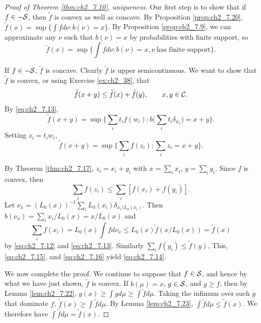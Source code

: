 \begin{proof}[Proof of Theorem \ref{thm:ch2_7.10}, uniqueness]
Our first step is to show that if $f \in -\mathcal{S}$, then $\widetilde{f}$ is convex as well as concave. By Proposition \ref{prop:ch2_7.20}, $\widetilde{f}(x) = \sup\{\int fd\nu : b(\nu) = x\}$. By Proposition \ref{prop:ch2_7.9}, we can approximate any $\nu$ such that $b(\nu) = x$ by probabilities with finite support, so
\begin{equation}\label{eq:ch2_7.13}
\widetilde{f}(x) = \sup\Big\{\int fd\nu : b(\nu) = x, \nu~\text{has finite support}\Big\}.
\end{equation}

If $f \in -\mathcal{S}$, $\widetilde{f}$ is concave. Clearly $\widetilde{f}$ is upper semicontinuous. We want to show that $\widetilde{f}$ is convex, or using Exercise \ref{ex:ch2_38}, that
\begin{equation}\label{eq:ch2_7.14}
    \widetilde{f}(x + y) \leq \widetilde{f}(x) + \widetilde{f}(y), \qquad x,y \in \mathcal{C}.
\end{equation}
By \eqref{eq:ch2_7.13},
\[
    \widetilde{f}(x + y) = \sup\Big\{\sum_i t_i f(w_i) : b\Big(\sum_i t_i\delta_{w_i}\Big) = x + y\Big\}.
\]
Setting $z_i=t_iw_i$,
\begin{equation}\label{eq:ch2_7.15}
    \widetilde{f}(x + y) = \sup\Big\{\sum_i f(z_i) : \sum_i z_i = x + y\Big\}.
\end{equation}

By Theorem \ref{thm:ch2_7.17}, $z_i = x_i + y_i$ with $x = \sum_i x_i$, $y = \sum_i y_i$. Since $f$ is convex, then
\begin{equation}\label{eq:ch2_7.16}
    \sum_i f(z_i) \leq \sum_i[f(x_i) + f(y_i)].
\end{equation}
Let $\nu_x = (L_0(x))^{-1}\sum_i L_0(x_i)\delta_{x_i/L_0(x_i)}$. Then $b(\nu_x) = \sum_i x_i/L_0(x) = x/L_0(x)$ and
\[
    \sum_i f(x_i) = L_0(x)\int fd\nu_x \leq L_0(x)\widetilde{f}(x/L_0(x)) = \widetilde{f}(x)
\]
by \eqref{eq:ch2_7.12} and \eqref{eq:ch2_7.13}. Similarly $\sum_i f(y_i) \leq \widetilde{f}(y)$, This, \eqref{eq:ch2_7.15}, and \eqref{eq:ch2_7.16} yield \eqref{eq:ch2_7.14}.


We now complete the proof. We continue to suppose that $f \in \mathcal{S}$, and hence by what we have just shown, $\widetilde{f}$ is convex. If $b(\mu) = x$, $g \in \mathcal{S}$, and $g \geq f$, then by Lemma \ref{lem:ch2_7.22}, $g(x) \geq \int gd\mu \geq \int \widetilde{f}d\mu$. Taking the infimum over such $g$ that dominate $f$, $\widetilde{f}(x) \geq \int \widetilde{f}d\mu$. By Lemma \ref{lem:ch2_7.23}, $\int \widetilde{f}d\mu \leq \widetilde{f}(x)$. We therefore have $\int \widetilde{f}d\mu = \widetilde{f}(x)$.


\end{proof}

